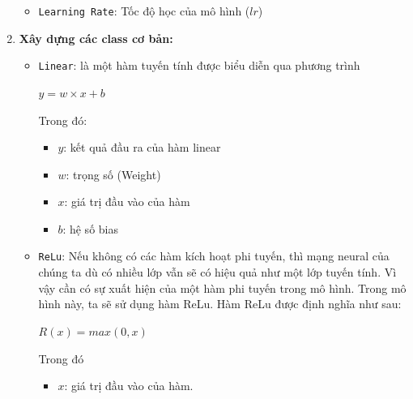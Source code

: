 \begin{enumerate}
\begin{itemize}
        \item \texttt{Learning Rate}: Tốc độ học của mô hình ($lr$) 
    \end{itemize}
    \item \textbf{Xây dựng các class cơ bản:}
    \begin{itemize} 
        \item \texttt{Linear}: là một hàm tuyến tính được biểu diễn qua phương trình
        \begin{center}
        \large $y = w \times x + b$
        \end{center}
        Trong đó: 
        \begin{itemize}
            \item $y$: kết quả đầu ra của hàm linear 
            \item $w$: trọng số (Weight)
            \item $x$: giá trị đầu vào của hàm 
            \item $b$: hệ số bias  
        \end{itemize}
        \item \texttt{ReLu}: Nếu không có các hàm kích hoạt phi tuyến, thì mạng neural của chúng ta dù có nhiều lớp vẫn sẽ có hiệu quả như một lớp tuyến tính. Vì vậy cần có sự xuất hiện của một hàm phi tuyến trong mô hình. Trong mô hình này, ta sẽ sử dụng hàm ReLu. Hàm ReLu được định nghĩa như sau: 
        \begin{center}
        \large $R(x) = max(0,x)$
        \end{center}
        Trong đó 
        \begin{itemize}
            \item $x$: giá trị đầu vào của hàm. 
        \end{itemize}
    \end{itemize}
    
    
\end{enumerate}
